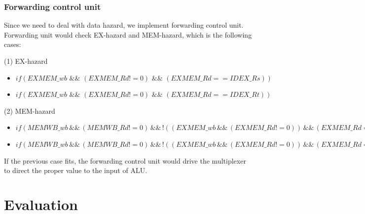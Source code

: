 \documentclass[11pt, a4paper]{article}
\begin{document}
\subsubsection{Forwarding control unit}
\par Since we need to deal with data hazard, we implement forwarding control unit. Forwarding unit would check EX-hazard and MEM-hazard, which is the following cases:
\par (1) EX-hazard
\begin{itemize}
\item $if (EXMEM\_wb \,\,\&\&\,\, (EXMEM\_Rd != 0)\,\,\&\&\,\,(EXMEM\_Rd == IDEX\_Rs))$
\item $if (EXMEM\_wb \,\,\&\&\,\, (EXMEM\_Rd != 0) \,\,\&\&\,\, (EXMEM\_Rd == IDEX\_Rt))$
\end{itemize}
\par (2) MEM-hazard
\begin{itemize}
\item $if (MEMWB\_wb \,\&\&\, (MEMWB\_Rd != 0) \,\&\&\, !((EXMEM\_wb \,\&\&\, (EXMEM\_Rd != 0)) \,\&\&\, (EXMEM\_Rd == IDEX\_Rs)) \,\&\&\, (MEMWB\_Rd == IDEX\_Rs))$
\item $if (MEMWB\_wb \,\&\&\, (MEMWB\_Rd != 0) \,\&\&\, !((EXMEM\_wb \,\&\&\, (EXMEM\_Rd != 0)) \,\&\&\, (EXMEM\_Rd == IDEX\_Rt)) \,\&\&\, (MEMWB\_Rd == IDEX\_Rt))$
\end{itemize}
\par If the previous case fits, the forwarding control unit would drive the multiplexer to direct the proper value to the input of ALU.


\section{Evaluation}
\end{document}
